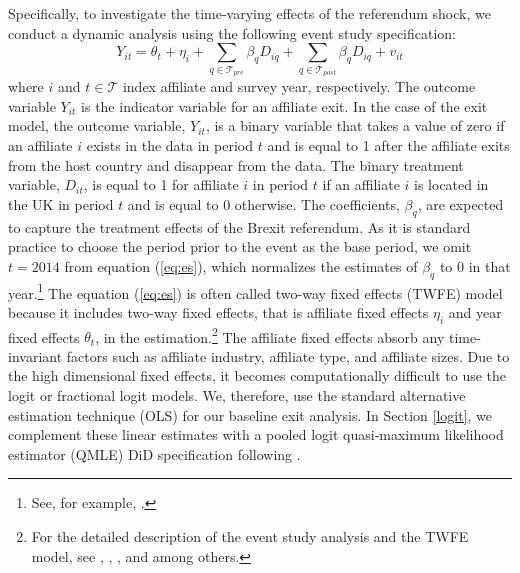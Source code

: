 \documentclass[preprint,11pt,authoryear]{elsarticle}
\begin{document}
Specifically, to investigate the time-varying effects of the referendum shock, we conduct a dynamic analysis using the following event study specification:
\begin{equation}\label{eq:es} 
Y_{i t}=\theta_{t}
+ \eta_{i}
+ \sum_{q \in \mathcal{T}_{pre}} \beta_{q} D_{i q}
+ \sum_{q \in \mathcal{T}_{post}} \beta_{q} D_{i q}
+v_{i t}
\end{equation}
where $i$ and $t \in \mathcal{T}$ index affiliate and survey year, respectively.
The outcome variable $Y_{it}$ is the indicator variable for an affiliate exit.
In the case of the exit model, the outcome variable, $Y_{it}$, is a binary variable that takes a value of zero if an affiliate $i$ exists in the data in period $t$ and is equal to 1 after the affiliate exits from the host country and disappear from the data.
The binary treatment variable, $D_{i t}$, is equal to 1 for affiliate $i$ in period $t$ if an affiliate $i$ is located in the UK in period $t$ and is equal to 0 otherwise. 
The coefficients, $\beta_{q}$, are expected to capture the treatment effects of the Brexit referendum.
As it is standard practice to choose the period prior to the event as the base period, we omit $t = 2014$ from equation (\ref{eq:es}), which normalizes the estimates of $\beta_{q}$ to 0 in that year.\footnote{See, for example, \cite{frey2021}.}
The equation (\ref{eq:es}) is often called two-way fixed effects (TWFE) model because it includes two-way fixed effects, that is affiliate fixed effects $\eta_{i}$ and year fixed effects $\theta_{t}$, in the estimation.\footnote{For the detailed description of the event study analysis and the TWFE model, see \cite{de2020two}, \cite{sun2021estimating}, \cite{callaway2023difference}, and \cite{roth2023survey} among others.}
The affiliate fixed effects absorb any time-invariant factors such as affiliate industry, affiliate type, and affiliate sizes.
Due to the high dimensional fixed effects, it becomes computationally difficult to use the logit or fractional logit models. We, therefore, use the standard alternative estimation technique (OLS) for our baseline exit analysis. In Section \ref{logit}, we complement these linear estimates with a pooled logit quasi-maximum likelihood estimator (QMLE) DiD specification following \citet{wooldridge2023simple}.
\end{document}
